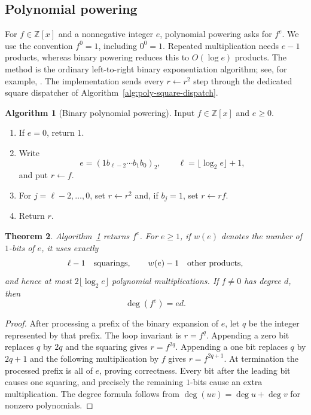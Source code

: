 \documentclass[11pt]{book}
\newtheorem{theorem}{Theorem}[section]
\theoremstyle{definition}
\newtheorem{algorithm}[theorem]{Algorithm}
\newcommand{\ZZ}{\mathbb Z}
\begin{document}
\subsection{Polynomial powering}

For $f\in\ZZ[x]$ and a nonnegative integer $e$, polynomial powering asks for
$f^e$.  We use the convention $f^0=1$, including $0^0=1$.  Repeated
multiplication needs $e-1$ products, whereas binary powering reduces this to
$O(\log e)$ products.  The method is the ordinary left-to-right binary
exponentiation algorithm; see, for example, \cite{BrentZimmermann2010}.
The implementation sends every $r\leftarrow r^2$ step through the dedicated
square dispatcher of Algorithm~\ref{alg:poly-square-dispatch}.

\begin{algorithm}[Binary polynomial powering]\label{alg:binary-poly-power}
Input $f\in\ZZ[x]$ and $e\ge0$.
\begin{enumerate}
 \item If $e=0$, return $1$.
 \item Write
 \[
   e=(1b_{\ell-2}\cdots b_1b_0)_2,
   \qquad \ell=\lfloor\log_2 e\rfloor+1,
 \]
 and put $r\leftarrow f$.
 \item For $j=\ell-2,\ldots,0$, set $r\leftarrow r^2$ and, if $b_j=1$,
 set $r\leftarrow rf$.
 \item Return $r$.
\end{enumerate}
\end{algorithm}

\begin{theorem}\label{thm:binary-poly-power}
Algorithm~\ref{alg:binary-poly-power} returns $f^e$.  For $e\ge1$, if
$w(e)$ denotes the number of $1$-bits of $e$, it uses exactly
\[
  \ell-1\quad\hbox{squarings},\qquad w(e)-1\quad\hbox{other products},
\]
and hence at most $2\lfloor\log_2 e\rfloor$ polynomial multiplications.
If $f\ne0$ has degree $d$, then
\[
 \deg(f^e)=ed.
\]
\end{theorem}

\begin{proof}
After processing a prefix of the binary expansion of $e$, let $q$ be the
integer represented by that prefix.  The loop invariant is $r=f^q$.
Appending a zero bit replaces $q$ by $2q$ and the squaring gives
$r=f^{2q}$.  Appending a one bit replaces $q$ by $2q+1$ and the following
multiplication by $f$ gives $r=f^{2q+1}$.  At termination the processed
prefix is all of $e$, proving correctness.  Every bit after the leading bit
causes one squaring, and precisely the remaining $1$-bits cause an extra
multiplication.  The degree formula follows from $\deg(uv)=\deg u+\deg v$
for nonzero polynomials.
\end{proof}
\end{document}
